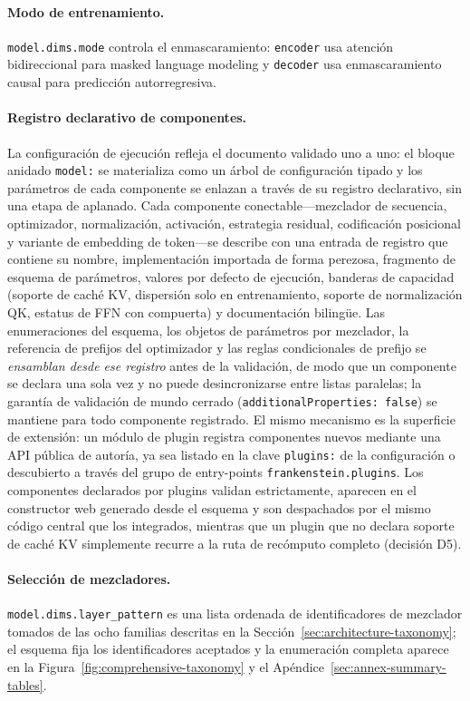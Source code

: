 \paragraph{Modo de entrenamiento.} \texttt{model.dims.mode} controla el enmascaramiento: \texttt{encoder} usa atención bidireccional para masked language modeling y \texttt{decoder} usa enmascaramiento causal para predicción autorregresiva.

\paragraph{Registro declarativo de componentes.} La configuración de ejecución refleja el documento validado uno a uno: el bloque anidado \texttt{model:} se materializa como un árbol de configuración tipado y los parámetros de cada componente se enlazan a través de su registro declarativo, sin una etapa de aplanado. Cada componente conectable---mezclador de secuencia, optimizador, normalización, activación, estrategia residual, codificación posicional y variante de embedding de token---se describe con una entrada de registro que contiene su nombre, implementación importada de forma perezosa, fragmento de esquema de parámetros, valores por defecto de ejecución, banderas de capacidad (soporte de caché KV, dispersión solo en entrenamiento, soporte de normalización QK, estatus de FFN con compuerta) y documentación bilingüe. Las enumeraciones del esquema, los objetos de parámetros por mezclador, la referencia de prefijos del optimizador y las reglas condicionales de prefijo se \emph{ensamblan desde ese registro} antes de la validación, de modo que un componente se declara una sola vez y no puede desincronizarse entre listas paralelas; la garantía de validación de mundo cerrado (\texttt{additionalProperties:~false}) se mantiene para todo componente registrado. El mismo mecanismo es la superficie de extensión: un módulo de plugin registra componentes nuevos mediante una API pública de autoría, ya sea listado en la clave \texttt{plugins:} de la configuración o descubierto a través del grupo de entry-points \texttt{frankenstein.plugins}. Los componentes declarados por plugins validan estrictamente, aparecen en el constructor web generado desde el esquema y son despachados por el mismo código central que los integrados, mientras que un plugin que no declara soporte de caché KV simplemente recurre a la ruta de recómputo completo (decisión D5).

\paragraph{Selección de mezcladores.} \texttt{model.dims.layer\_pattern} es una lista ordenada de identificadores de mezclador tomados de las ocho familias descritas en la Sección~\ref{sec:architecture-taxonomy}; el esquema fija los identificadores aceptados y la enumeración completa aparece en la Figura~\ref{fig:comprehensive-taxonomy} y el Apéndice~\ref{sec:annex-summary-tables}.

